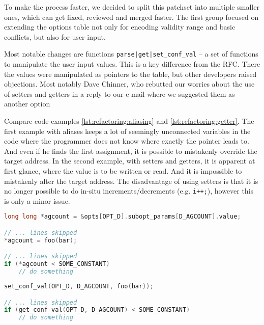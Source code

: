 To make the process faster, we decided to split this patchset into multiple
smaller ones, which can get fixed, reviewed and merged faster. The first
group focused on extending the options table not only for encoding validity
range and basic conflicts, but also for user input.

Most notable changes are functions {\tt parse|get|set\_conf\_val}
-- a set of functions to manipulate the user input values. This is a key
difference from the RFC. There the values were manipulated as pointers to the
table, but other developers raised objections. Most notably Dave Chinner, who
rebutted our worries about the use of setters and getters in a reply to our
e-mail where we suggested them as another option~\cite{unifyTypes1, unifyTypes2}

Compare code examples \ref{lst:refactoring:aliasing} and
\ref{lst:refactoring:getter}.  The first example with aliases keeps a lot of
seemingly unconnected variables in the code where the programmer does not know
where exactly the pointer leads to. And even if he finds the first assignment,
it is possible to mistakenly override the target address. In the second
example, with setters and getters, it is apparent at first glance, where
the value is to be written or read. And it is impossible to mistakenly alter
the target address. The disadvantage of using setters is that it is no longer possible to do in-situ increments/decrements (e.g. {\tt i++;}), however this is only a minor issue.

\begin{lstlisting}[frame=none, basicstyle=\footnotesize\ttfamily,
language=C, numbers=none, numberstyle=\tiny\color{black},
label={lst:refactoring:aliasing},
caption={Pointer aliases in RFC of the second set.}]
long long *agcount = &opts[OPT_D].subopt_params[D_AGCOUNT].value;

// ... lines skipped
*agcount = foo(bar);

// ... lines skipped
if (*agcount < SOME_CONSTANT)
	// do something
\end{lstlisting}

\begin{lstlisting}[frame=none, basicstyle=\footnotesize\ttfamily,
language=C, numbers=none, numberstyle=\tiny\color{black},
label={lst:refactoring:getter},
caption={Setters and getters in later version of the second set.}]
set_conf_val(OPT_D, D_AGCOUNT, foo(bar));

// ... lines skipped
if (get_conf_val(OPT_D, D_AGCOUNT) < SOME_CONSTANT)
	// do something
\end{lstlisting}

